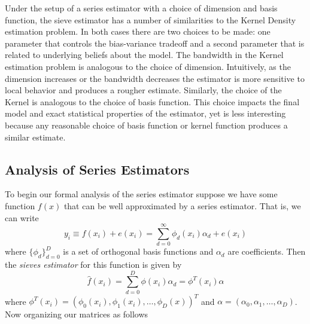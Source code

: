 \documentclass[12pt]{article}  %
\begin{document}
Under the setup of a series estimator with a choice of dimension and basis function, the sieve estimator has a number of similarities to the Kernel Density estimation problem.  In both cases there are two choices to be made: one parameter that controls the bias-variance tradeoff and a second parameter that is related to underlying beliefs about the model.  The bandwidth in the Kernel estimation problem is analogous to the choice of dimension. Intuitively, as the dimension increases or the bandwidth decreases the estimator is more sensitive to local behavior and produces a rougher estimate. Similarly, the choice of the Kernel is analogous to the choice of basis function. This choice impacts the final model and exact statistical properties of the estimator, yet is less interesting because any reasonable choice of basis function or kernel function produces a similar estimate. 

\subsection{Analysis of Series Estimators}

To begin our formal analysis of the series estimator suppose we have some function $f(x)$ that can be well approximated by a series estimator. That is, we can write $$y_i\equiv f(x_i) + e(x_i)= \sum_{d=0}^{\infty}\phi_{d}(x_i)\alpha_d + e(x_i)$$
where $\{\phi_d\}_{d=0}^{D}$ is a set of orthogonal basis functions and $\alpha_d$ are coefficients. Then the \textit{sieves estimator} for this function is given by $$\hat{f}(x_i) = \sum_{d=0}^{D}\phi(x_i)\alpha_{d} = \phi^{T}(x_i)\alpha$$where $\phi^{T}(x_i) = (\phi_{0}(x_i), \phi_{1}(x_i),\ldots, \phi_D(x))^{T}$ and $\alpha = (\alpha_0, \alpha_1, \ldots, \alpha_D)$. Now organizing our matrices as follows 
\end{document}
